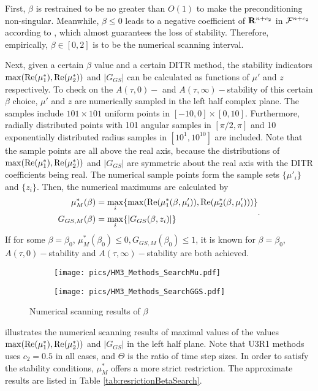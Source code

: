 First, $\beta$ is restrained to be no greater than $O(1)$ to make
the preconditioning non-singular.
Meanwhile, $\beta\leq 0$ leads to a negative coefficient of $\mathbf{R}^{n+c_2}$
in $\mathcal{F}^{n+c_2}$ according to , which almost
guarantees the loss of stability. Therefore, empirically, $\beta\in[0,2]$
is to be the numerical scanning interval.

Next, given a certain $\beta$ value and a certain DITR method, the
stability indicators $\max(\mathrm{Re}(\mu^*_1),\mathrm{Re}(\mu^*_2))$ and $|G_{GS}|$
can be calculated as functions of $\mu'$ and $z$ respectively.
To check on the $A(\tau,0)-$ and $A(\tau,\infty)-$stability of this
certain $\beta$ choice, $\mu'$ and $z$ are numerically sampled
in the left half complex plane. The samples include $101\times101$
uniform points in $[-10,0]\times[0,10]$. Furthermore, radially distributed
points with 101 angular samples in $[\pi/2,\pi]$ and 10 exponentially
distributed radius samples in $[10^1, 10^{10}]$ are included.
Note that the sample points are all above the real axis, because the
distributions of $\max(\mathrm{Re}(\mu^*_1),\mathrm{Re}(\mu^*_2))$ and $|G_{GS}|$
are symmetric about the real axis with the DITR coefficients being real.
The numerical sample points form the sample
sets $\{\mu'_i\}$ and $\{z_i\}$. Then, the numerical maximums are
calculated by
\begin{equation}
    \begin{aligned}
        \mu^*_{M}(\beta) & = \max_{i}\{\max(\mathrm{Re}(\mu^*_1(\beta,\mu'_i)),\mathrm{Re}(\mu^*_2(\beta,\mu'_i)))\} \\
        G_{GS,M}(\beta)  & = \max_{i}\{|G_{GS}(\beta,z_i)|\}
    \end{aligned}.
\end{equation}
If for some $\beta=\beta_0$, $\mu^*_{M}(\beta_0) \leq 0,G_{GS,M}(\beta_0) \leq 1$,
it is known for  $\beta=\beta_0$, $A(\tau,0)-$stability and
$A(\tau,\infty)-$stability are both achieved.


\begin{figure}[htbp]
    \centering
    \begin{subfigure}{0.5\textwidth}
        \texttt{[image: pics/HM3\_Methods\_SearchMu.pdf]}
    \end{subfigure}\hfill
    \begin{subfigure}{0.5\textwidth}
        \texttt{[image: pics/HM3\_Methods\_SearchGGS.pdf]}
    \end{subfigure}
    \caption{Numerical scanning results of $\beta$}
    \label{fig:MuGGSSearch}
\end{figure}
 illustrates the numerical scanning
results of maximal values of the values
$\max(\mathrm{Re}(\mu^*_1),\mathrm{Re}(\mu^*_2))$ and $|G_{GS}|$ in the left
half plane. Note that U3R1 methods uses $c_2=0.5$ in all cases, and $\Theta$ is
the ratio of time step sizes.
In order to satisfy the stability conditions,
$\mu^*_{M}$ offers a more strict restriction.
The approximate results are listed in Table \ref{tab:resrictionBetaSearch}.

